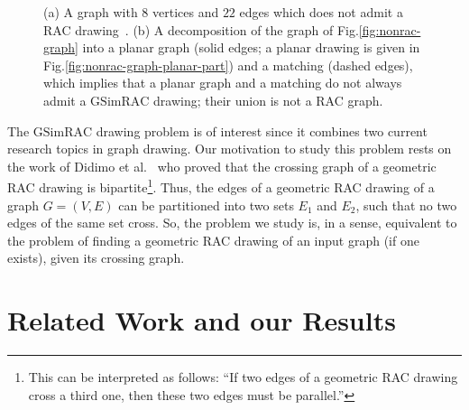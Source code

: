 \documentclass{llncs}
\newcommand{\GSimRAC}{\mathrm{GSimRAC}}
\begin{document}
\begin{figure}[t!hb]
  \centering
  \begin{minipage}[b]{.28\textwidth}
     \centering
  \end{minipage}
  \hfill
  \begin{minipage}[b]{.28\textwidth}
     \centering
  \end{minipage}
  \hfill
  \begin{minipage}[b]{.37\textwidth}
     \centering
  \end{minipage}
  \caption{(a) A graph with $8$ vertices and $22$ edges which does not admit a RAC drawing\
  \cite{EL11}. (b) A decomposition of the
  graph of Fig.\ref{fig:nonrac-graph} into a planar graph (solid edges; a planar drawing is
  given in Fig.\ref{fig:nonrac-graph-planar-part}) and a matching (dashed edges),
  which implies that a planar graph and a matching do not always admit a $\GSimRAC$ drawing; their union is not a RAC graph.}
  \label{fig:nonrac-graph-example}
\end{figure}

The $\GSimRAC$ drawing problem is of
interest since it combines two current research topics in graph
drawing. Our motivation to study this
problem rests on the work of Didimo et al.\ \cite{DEL09} who proved
that the crossing graph of a geometric RAC drawing is
bipartite\footnote{This can be interpreted as follows: ``If two
edges of a geometric RAC drawing cross a third one, then these two
edges must be parallel.''}. Thus, the edges of a geometric RAC
drawing of a graph $G=(V,E)$ can be partitioned into two sets $E_1$
and $E_2$, such that no two edges of the same set cross. So, the
problem we study is, in a sense, equivalent to the problem of
finding a geometric RAC drawing of an input graph (if one exists),
given its crossing graph.

\section{Related Work and our Results}
\label{sec:related-work}
\end{document}
